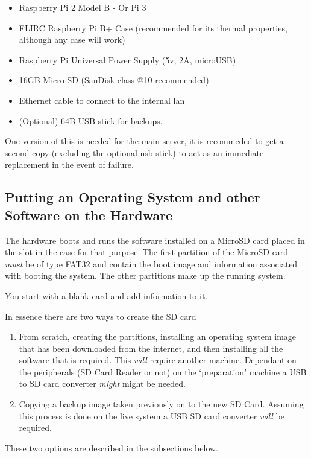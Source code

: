 \documentclass[Draft]{akc}
\begin{document}
\begin{itemize}
\item Raspberry Pi 2 Model B - Or Pi 3
\item FLIRC Raspberry Pi B+ Case (recommended for its thermal properties, although any case will work)
\item Raspberry Pi Universal Power Supply (5v, 2A, microUSB)
\item 16GB Micro SD (SanDisk class @10 recommended)
\item Ethernet cable to connect to the internal lan
\item (Optional) 64B USB stick for backups.
\end{itemize}

One version of this is needed for the main server, it is recommeded to get a second copy (excluding
the optional usb stick) to act as an immediate replacement in the event of failure.

\subsection{Putting an Operating System and other Software on the Hardware}

The hardware boots and runs the software installed on a MicroSD card placed in the slot in the case
for that purpose.  The first partition of the MicroSD card \emph{must} be of type FAT32 and contain
the boot image and information associated with booting the system.  The other partitions make up the
running system.

You start with a blank card and add information to it.

In essence there are two ways to create the SD card
\begin{enumerate}
\item From scratch, creating the partitions, installing an operating system image that has been
downloaded from the internet, and then installing all the software that is required.  This
\emph{will} require another machine.  Dependant on the peripherals (SD Card Reader or not) on the
`preparation' machine a USB to SD card converter  \emph{might} might be needed.
\item Copying a backup image taken previously on to the new SD Card.  Assuming this process is done
on the live system a USB SD card converter \emph{will} be required.
\end{enumerate}

These two options are described in the subsections below.
\end{document}
